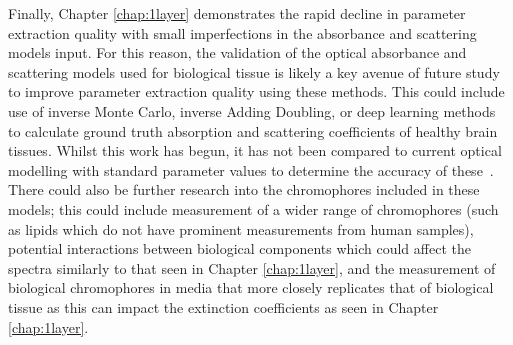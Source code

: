 Finally, Chapter \ref{chap:1layer} demonstrates the rapid decline in parameter extraction quality with small imperfections in the absorbance and scattering models input. For this reason, the validation of the optical absorbance and scattering models used for biological tissue is likely a key avenue of future study to improve parameter extraction quality using these methods. This could include use of inverse Monte Carlo, inverse Adding Doubling, or deep learning methods to calculate ground truth absorption and scattering coefficients of healthy brain tissues. Whilst this work has begun, it has not been compared to current optical modelling with standard parameter values to determine the accuracy of these~\cite{Sabino2016, Eggert1987, Shapey2022, Hokr2021}. There could also be further research into the chromophores included in these models; this could include measurement of a wider range of chromophores (such as lipids which do not have prominent measurements from human samples), potential interactions between biological components which could affect the spectra similarly to that seen in Chapter \ref{chap:1layer}, and the measurement of biological chromophores in media that more closely replicates that of biological tissue as this can impact the extinction coefficients as seen in Chapter \ref{chap:1layer}.